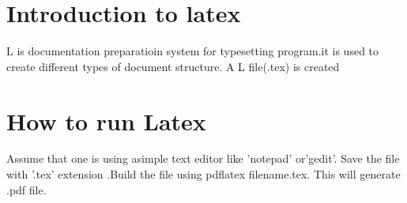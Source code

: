 \documentclass[a5paper,50pt]{article}
\begin{document}
   \section{Introduction to latex}
   L is documentation preparatioin system for typesetting program.it is used to create different types of document structure. A L file(.tex) is created
   \section{How to run Latex}
   Assume that one is using asimple text editor like 'notepad' or'gedit'. Save the file with '.tex' extension .Build the file using pdflatex filename.tex. This will generate .pdf file.
   
\end{document}
